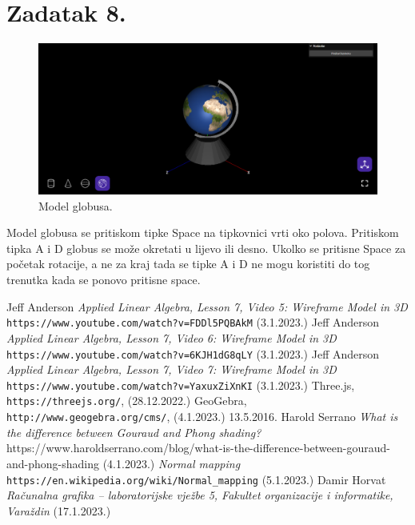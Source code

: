 \documentclass[a4paper,12pt]{article}
\begin{document}
\pagebreak
\section{Zadatak 8.}
\begin{figure}[ht]
    \centering
    \includegraphics[scale=0.5]{image/zadatak8.png}
    \caption{Model globusa.}
\end{figure}
Model globusa se pritiskom tipke Space na tipkovnici vrti oko polova. Pritiskom tipka A i D globus se može okretati u lijevo ili desno. Ukolko se pritisne Space za početak rotacije, 
a ne za kraj tada se tipke A i D ne mogu koristiti do tog trenutka kada se ponovo pritisne space.

\pagebreak

\begin{thebibliography}{9}

 Jeff Anderson \emph{Applied Linear Algebra, Lesson 7, Video 5: Wireframe Model in 3D} \texttt{https://www.youtube.com/watch?v=FDDl5PQBAkM} (3.1.2023.)
 Jeff Anderson \emph{Applied Linear Algebra, Lesson 7, Video 6: Wireframe Model in 3D} \texttt{https://www.youtube.com/watch?v=6KJH1dG8qLY} (3.1.2023.)
 Jeff Anderson \emph{Applied Linear Algebra, Lesson 7, Video 7: Wireframe Model in 3D} \texttt{https://www.youtube.com/watch?v=YaxuxZiXnKI} (3.1.2023.)
 Three.js, \texttt{https://threejs.org/}, (28.12.2022.)
 GeoGebra, \texttt{http://www.geogebra.org/cms/}, (4.1.2023.)
  13.5.2016. Harold Serrano \emph{What is the difference between Gouraud and Phong shading?} https://www.haroldserrano.com/blog/what-is-the-difference-between-gouraud-and-phong-shading (4.1.2023.)
 \emph{Normal mapping} \texttt{https://en.wikipedia.org/wiki/Normal\_mapping} (5.1.2023.)
 Damir Horvat \emph{Računalna grafika – laboratorijske vježbe 5, Fakultet organizacije i informatike, Varaždin} (17.1.2023.)
\end{thebibliography}
\end{document}
